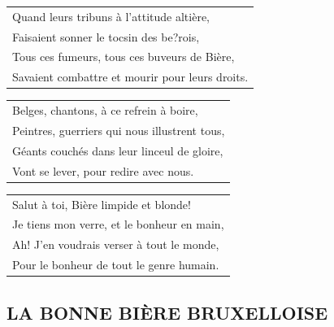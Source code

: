 \documentclass[a4paper, 14pt]{extarticle}
\begin{document}
\begin{flushleft}
\begin{tabularx}{0.8\textwidth} {
   >{\raggedright\arraybackslash}X}
Quand leurs tribuns à l’attitude altière, \\
Faisaient sonner le tocsin des be?rois, \\
Tous ces fumeurs, tous ces buveurs de Bière, \\
Savaient combattre et mourir pour leurs droits. \\
\end{tabularx}
\end{flushleft}
\begin{flushleft}
\begin{tabularx}{0.8\textwidth} {
   >{\raggedright\arraybackslash}X}
Belges, chantons, à ce refrein à boire, \\
Peintres, guerriers qui nous illustrent tous, \\
Géants couchés dans leur linceul de gloire, \\
Vont se lever, pour redire avec nous. \\
\end{tabularx}
\end{flushleft}
\begin{flushleft}
\begin{tabularx}{0.8\textwidth} {
   >{\raggedright\arraybackslash}X}
Salut à toi, Bière limpide et blonde! \\
Je tiens mon verre, et le bonheur en main, \\
Ah! J’en voudrais verser à tout le monde, \\
Pour le bonheur de tout le genre humain. \\
\end{tabularx}
\end{flushleft}
\subsection*{LA BONNE BIÈRE BRUXELLOISE}
\end{document}
